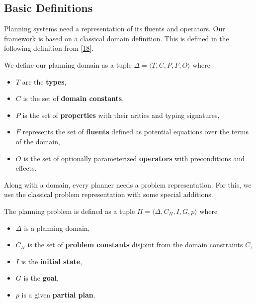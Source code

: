\subsection{Basic Definitions}\label{basic-definitions}

Planning systems need a representation of its fluents and operators. Our
framework is based on a classical domain definition. This is defined in
the following definition from
{[}\protect\hyperlink{ref-gobelbeckerux5fcomingux5f2010}{18}{]}.

\begin{definition}[Domain]\label{def:domain}

We define our planning domain as a tuple
\(\Delta = \langle T, C, P, F, O \rangle\) where

\begin{itemize}
\tightlist
\item
  \(T\) are the \textbf{types},
\item
  \(C\) is the set of \textbf{domain constants},
\item
  \(P\) is the set of \textbf{properties} with their arities and typing
  signatures,
\item
  \(F\) represents the set of \textbf{fluents} defined as potential
  equations over the terms of the domain,
\item
  \(O\) is the set of optionally parameterized \textbf{operators} with
  preconditions and effects.
\end{itemize}

\end{definition}

Along with a domain, every planner needs a problem representation. For
this, we use the classical problem representation with some special
additions.

\begin{definition}[Problem]\label{def:problem}

The planning problem is defined as a tuple
\(\Pi = \langle \Delta, C_\Pi, I, G, p\rangle\) where

\begin{itemize}
\tightlist
\item
  \(\Delta\) is a planning domain,
\item
  \(C_\Pi\) is the set of \textbf{problem constants} disjoint from the
  domain constraints \(C\),
\item
  \(I\) is the \textbf{initial state},
\item
  \(G\) is the \textbf{goal},
\item
  \(p\) is a given \textbf{partial plan}.
\end{itemize}

\end{definition}

